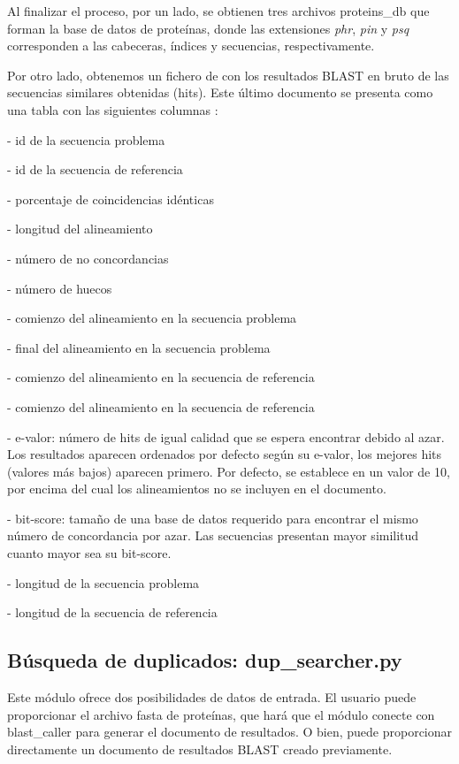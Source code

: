 Al finalizar el proceso, por un lado, se obtienen tres archivos proteins\_db que forman la base de datos de proteínas, donde las extensiones \textit{phr}, \textit{pin} y \textit{psq} corresponden a las cabeceras, índices y secuencias, respectivamente. 

Por otro lado, obtenemos un fichero de con los resultados BLAST en bruto de las secuencias similares obtenidas (hits). Este último documento se presenta como una tabla con las siguientes columnas \cite{scholz_blastn_nodate, scholz_e-value_nodate}:

- id de la secuencia problema

- id de la secuencia de referencia

- porcentaje de coincidencias idénticas

- longitud del alineamiento

- número de no concordancias 

- número de huecos

- comienzo del alineamiento en la secuencia problema

- final del alineamiento en la secuencia problema

- comienzo del alineamiento en la secuencia de referencia

- comienzo del alineamiento en la secuencia de referencia

-  e-valor: número de hits de igual calidad que se espera encontrar debido al azar. Los resultados aparecen ordenados por defecto según su e-valor, los mejores hits (valores más bajos) aparecen primero. Por defecto, se establece en un valor de 10, por encima del cual los alineamientos no se incluyen en el documento.

- bit-score: tamaño de una base de datos requerido para encontrar el mismo número de concordancia por azar. Las secuencias presentan mayor similitud cuanto mayor sea su bit-score.

- longitud de la secuencia problema

- longitud de la secuencia de referencia

\subsection{Búsqueda de duplicados: dup\_searcher.py}

Este módulo ofrece dos posibilidades de datos de entrada. El usuario puede proporcionar el archivo fasta de proteínas, que hará que el módulo conecte con blast\_caller para generar el documento de resultados. O bien, puede proporcionar directamente un documento de resultados BLAST creado previamente.

